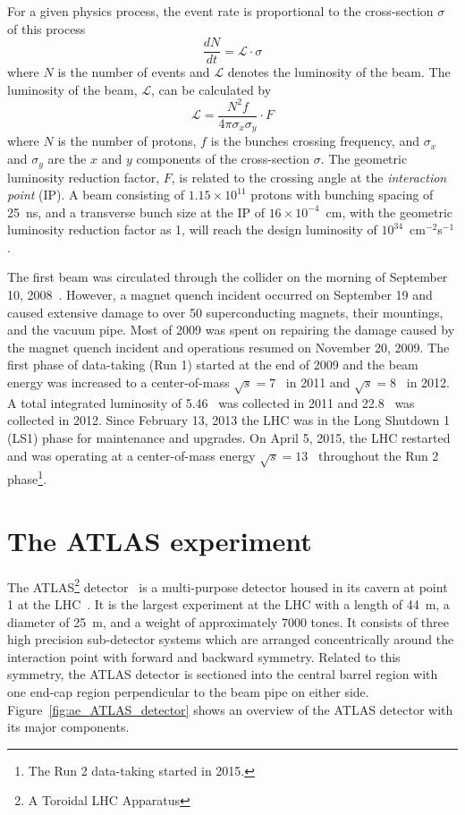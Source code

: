 For a given physics process, the event rate is proportional to the cross-section $\sigma$ of this process
%
\begin{equation}
    \frac{dN}{dt} = \mathcal{L}\cdot\sigma
\end{equation}
%
where $N$ is the number of events and $\mathcal{L}$ denotes the luminosity of the beam.
The luminosity of the beam, $\mathcal{L}$, can be calculated by
%
\begin{equation}
    \mathcal{L} = \frac{N^{2} f}{4 \pi \sigma_{x} \sigma_{y}} \cdot F
\end{equation}
%
where $N$ is the number of protons, $f$ is the bunches crossing frequency, and $\sigma_{x}$ and $\sigma_{y}$ are the $x$ and $y$ components of the cross-section $\sigma$.
The geometric luminosity reduction factor, $F$, is related to the crossing angle at the \textit{interaction point} (IP).
A beam consisting of $1.15 \times 10^{11}$ protons with bunching spacing of 25~ns, and a transverse bunch size at the IP of $16\times 10^{-4}$~cm, with the geometric luminosity reduction factor as 1, will reach the design luminosity of $10^{34}$~cm$^{-2}$s$^{-1}$.

The first beam was circulated through the collider on the morning of September 10, 2008~\cite{CERN-COURIER-Sep192008}.
However, a magnet quench incident occurred on September 19 and caused extensive damage to over 50 superconducting magnets, their mountings, and the vacuum pipe.
Most of 2009 was spent on repairing the damage caused by the magnet quench incident and operations resumed on November 20, 2009.
The first phase of data-taking (Run 1) started at the end of 2009 and the beam energy was increased to a center-of-mass $\sqrt{s}=7$~{\TeV} in 2011 and $\sqrt{s} = 8$~{\TeV} in 2012.
A total integrated luminosity of 5.46~{\ifb} was collected in 2011 and 22.8~{\ifb} was collected in 2012.
Since February 13, 2013 the LHC was in the Long Shutdown 1 (LS1) phase for maintenance and upgrades.
On April 5, 2015, the LHC restarted and was operating at a center-of-mass energy $\sqrt{s}=13$~{\TeV} throughout the Run 2 phase\footnote{The Run 2 data-taking started in 2015.}.


\section{The ATLAS experiment}
\label{sec:ae_ATLAS}
The ATLAS\footnote{A Toroidal LHC Apparatus} detector~\cite{Aad:2008zzm} is a multi-purpose detector housed in its cavern at point 1 at the LHC~\cite{Evans:2008zzb}.
It is the largest experiment at the LHC with a length of 44~m, a diameter of 25~m, and a weight of approximately 7000 tones.
It consists of three high precision sub-detector systems which are arranged concentrically around the interaction point with forward and backward symmetry.
Related to this symmetry, the ATLAS detector is sectioned into the central barrel region with one end-cap region perpendicular to the beam pipe on either side.
Figure~\ref{fig:ae_ATLAS_detector} shows an overview of the ATLAS detector with its major components.

